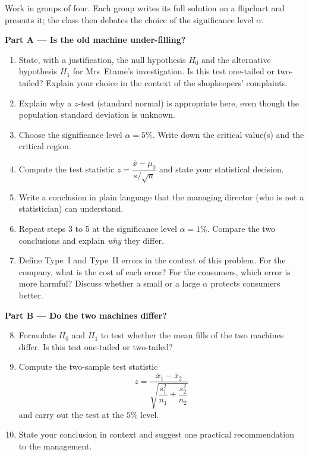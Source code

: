 \documentclass[11pt]{article}
\newcounter{popsec}
\newcounter{popsub}
\newcommand{\courssub}[1]{%
  \stepcounter{popsub}%
  \par\vspace{9pt}\noindent{\popxbold\fontsize{11.5}{13}\selectfont\color{popink}{\color{poporange}\thepopsec.\thepopsub}\hspace{6pt}#1}\par\nopagebreak\vspace{4pt}
}
\begin{document}
Work in groups of four. Each group writes its full solution on a flipchart and presents it; the class then debates the choice of the significance level $\alpha$.

\courssub{Tasks}

\textbf{Part A — Is the old machine under-filling?}

\begin{enumerate}
\item State, with a justification, the null hypothesis $H_0$ and the alternative hypothesis $H_1$ for Mrs~Etame's investigation. Is this test one-tailed or two-tailed? Explain your choice in the context of the shopkeepers' complaints.
\item Explain why a $z$-test (standard normal) is appropriate here, even though the population standard deviation is unknown.
\item Choose the significance level $\alpha = 5\%$. Write down the critical value(s) and the critical region.
\item Compute the test statistic $z = \dfrac{\bar{x}-\mu_0}{s/\sqrt{n}}$ and state your statistical decision.
\item Write a conclusion in plain language that the managing director (who is not a statistician) can understand.
\item Repeat steps 3 to 5 at the significance level $\alpha = 1\%$. Compare the two conclusions and explain \emph{why} they differ.
\item Define Type~I and Type~II errors in the context of this problem. For the company, what is the cost of each error? For the consumers, which error is more harmful? Discuss whether a small or a large $\alpha$ protects consumers better.
\end{enumerate}

\textbf{Part B — Do the two machines differ?}

\begin{enumerate}
\setcounter{enumi}{7}
\item Formulate $H_0$ and $H_1$ to test whether the mean fills of the two machines differ. Is this test one-tailed or two-tailed?
\item Compute the two-sample test statistic
\[
z = \frac{\bar{x}_1 - \bar{x}_2}{\sqrt{\dfrac{s_1^2}{n_1}+\dfrac{s_2^2}{n_2}}}
\]
and carry out the test at the $5\%$ level.
\item State your conclusion in context and suggest one practical recommendation to the management.
\end{enumerate}
\end{document}
